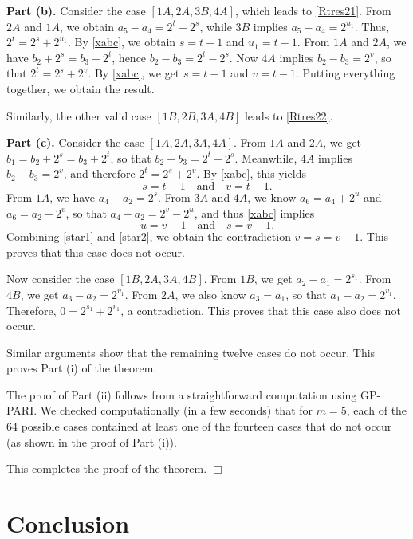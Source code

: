 \documentclass[12pt, reqno]{article}
\theoremstyle{plain}
\theoremstyle{definition}
\theoremstyle{remark}
\begin{document}
\textbf{Part (b).} Consider the case $[1A,2A,3B,4A]$, which leads to \eqref{Rtres21}. From $2A$ and $1A$, we obtain $a_5 - a_4 = 2^t - 2^s$, while $3B$ implies $a_5 - a_4 = 2^{u_1}$. Thus, $2^t = 2^s + 2^{u_1}$. By \eqref{xabc}, we obtain $s = t-1$ and $u_1 = t - 1$. From $1A$ and $2A$, we have $b_2 + 2^s = b_3 + 2^t$, hence $b_2 - b_3 = 2^t - 2^s$. Now $4A$ implies $b_2 - b_3 = 2^v$, so that $2^t = 2^s + 2^v$. By \eqref{xabc}, we get $s = t - 1$ and $v = t - 1$. Putting everything together, we obtain the result.

Similarly, the other valid case $[1B,2B,3A,4B]$ leads to \eqref{Rtres22}.

\textbf{Part (c).} Consider the case $[1A,2A,3A,4A]$. From $1A$ and $2A$, we get $b_1 = b_2 + 2^s = b_3 + 2^t$, so that $b_2 - b_3 = 2^t - 2^s$. Meanwhile, $4A$ implies $b_2 - b_3 = 2^v$, and therefore $2^t = 2^s + 2^v$. By \eqref{xabc}, this yields
\begin{equation}
s = t - 1 \quad \text{and} \quad v = t - 1.
\label{star1}
\end{equation}
From $1A$, we have $a_4 - a_2 = 2^s$. From $3A$ and $4A$, we know $a_6 = a_4 + 2^u$ and $a_6 = a_2 + 2^v$, so that $a_4 - a_2 = 2^v - 2^u$, and thus \eqref{xabc} implies
\begin{equation}
u = v - 1 \quad \text{and} \quad s = v - 1.
\label{star2}
\end{equation}
Combining \eqref{star1} and \eqref{star2}, we obtain the contradiction $v = s = v - 1$. This proves that this case does not occur.

Now consider the case $[1B,2A,3A,4B]$. From $1B$, we get $a_2 - a_1 = 2^{s_1}$. From $4B$, we get $a_3 - a_2 = 2^{v_1}$. From $2A$, we also know $a_3 = a_1$, so that $a_1 - a_2 = 2^{v_1}$. Therefore, $0 = 2^{s_1} + 2^{v_1}$, a contradiction. This proves that this case also does not occur.

Similar arguments show that the remaining twelve cases do not occur. This proves Part (i) of the theorem.

The proof of Part (ii) follows from a straightforward computation using GP-PARI. We checked computationally (in a few seconds) that for $m = 5$, each of the $64$ possible cases contained at least one of the fourteen cases that do not occur (as shown in the proof of Part (i)).

This completes the proof of the theorem.
\hfill $\Box$

\section{Conclusion}
\end{document}
